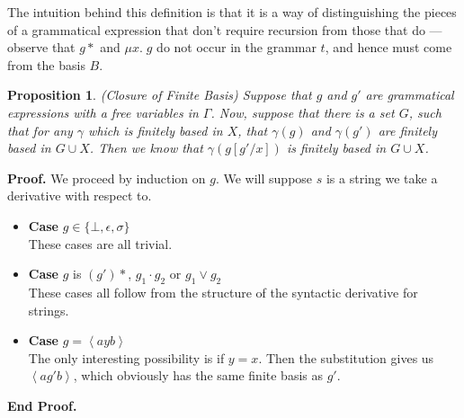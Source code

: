 \documentclass{article}
\newcommand{\fix}[2]{\mu {#1}.\;{#2}}
\newcommand{\lft}[1]{\left<{#1}\right.}
\newcommand{\rgt}[1]{\left.{#1}\right>}
\newcommand{\setof}[1]{\{{#1}\}}
\newtheorem{prop}{Proposition}
\newenvironment{proof}{\noindent\textbf{Proof.}}
{\noindent\textbf{End Proof.}}
\newenvironment{caseblock}{\begin{itemize}}{\end{itemize}}
\newenvironment{case}[1]{\item \textbf{Case} {#1}\\}{}
\begin{document}
The intuition behind this definition is that it is a way of
distinguishing the pieces of a grammatical expression that don't
require recursion from those that do --- observe that $g*$ and
$\fix{x}{g}$ do not occur in the grammar $t$, and hence must 
come from the basis $B$. 

\begin{prop}{(Closure of Finite Basis)}
Suppose that $g$ and $g'$ are grammatical expressions with a free
variables in $\Gamma$. Now, suppose that there is a set $G$, such that
for any $\gamma$ which is finitely based in $X$, that $\gamma(g)$ and
$\gamma(g')$ are finitely based in $G \cup X$.  Then we know that
$\gamma(g[g'/x])$ is finitely based in $G \cup X$.
\end{prop}

\begin{proof}
We proceed by induction on $g$. We will suppose $s$ is a string we 
take a derivative with respect to. 
\begin{caseblock}
  \begin{case}{$g \in \setof{\bot, \epsilon, \sigma}$}
    These cases are all trivial. 
  \end{case}

  \begin{case}{$g$ is $(g')*$, $g_1\cdot g_2$ or $g_1 \vee g_2$}
    These cases all follow from the structure of the syntactic derivative
    for strings. 
  \end{case}

  \begin{case}{$g = \lft{a}y\rgt{b}$}
    The only interesting possibility is if $y = x$. Then the substitution 
    gives us $\lft{a}g'\rgt{b}$, which obviously has the same finite basis as $g'$. 
  \end{case}


\end{caseblock}
\end{proof}
\end{document}
